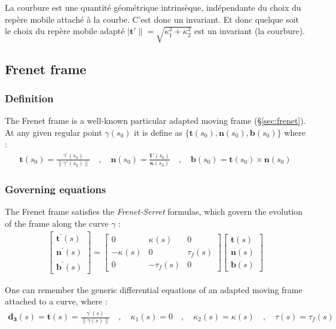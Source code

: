 La courbure est une quantité géométrique intrinsèque, indépendante du choix du repère mobile attaché à la courbe. C'est donc un invariant. Et donc quelque soit le choix du repère mobile adapté $|\mathbf{t'}\| = \sqrt{\kappa_1^2 + \kappa_2^2}$ est un invariant (la courbure).

\subsection{Frenet frame}

\subsubsection{Definition}
The Frenet frame is a well-known particular adapted moving frame (§\ref{sec:frenet}). At any given regular point $\gamma(s_0)$ it is define as $\{\mathbf{t}(s_0),\mathbf{n}(s_0),\mathbf{b}(s_0)\}$ where : 
\begin{gather}
\mathbf{t}(s_0) = \frac{\gamma^{'}(s_0)}{\|\gamma'(s_0)\|}
\quad,\quad
\mathbf{n}(s_0) = \frac{\mathbf{t'}(s_0)}{\mathbf{\kappa}(s_0)}
\quad,\quad
\mathbf{b}(s_0)= \mathbf{t}(s_0)\times\mathbf{n}(s_0)
\end{gather}

\subsubsection{Governing equations}
The Frenet frame satisfies the \emph{Frenet-Serret} formulas, which govern the evolution of the frame along the curve $\gamma$ :
\begin{gather}
\left[\begin{array}{c}
\mathbf{t^{'}}(s) \\
\mathbf{n^{'}}(s) \\
\mathbf{b^{'}}(s)
\end{array}\right]
=
\left[\begin{array}{ccc}
0 & \kappa_{}(s) & 0 \\
-\kappa_{}(s) & 0 & \tau_f(s) \\
0 & -\tau_f(s) & 0
\end{array}\right]
\left[\begin{array}{c}
\mathbf{t}(s) \\
\mathbf{n}(s) \\
\mathbf{b}(s)
\end{array}\right]
\end{gather}

One can remember the generic differential equations of an adapted moving frame attached to a curve, where : 
\begin{gather}
\mathbf{d_{3}}(s) = \mathbf{t}(s) = \frac{\gamma^{'}(s)}{\|\gamma(s)\|}
\quad,\quad
\kappa_{1}(s) = 0
\quad,\quad
\kappa_{2}(s) = \kappa(s)
\quad,\quad
\tau(s) = \tau_{f}(s)
\end{gather}

